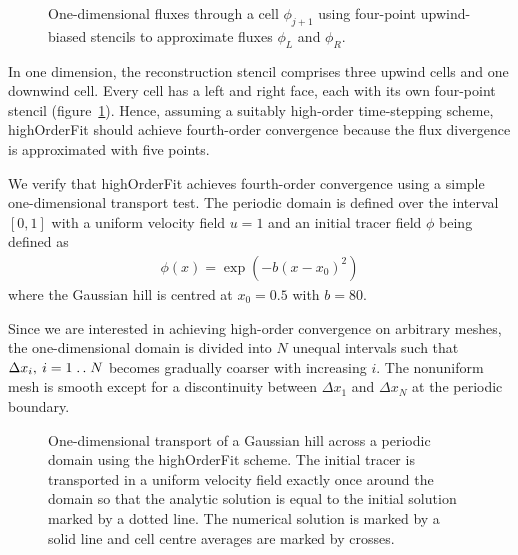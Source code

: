 \documentclass[a4paper,11pt]{article}
\newcommand{\isep}{\mathrel{{.}\,{.}}\nobreak}
\begin{document}
\begin{figure}
	\centering
	\caption{One-dimensional fluxes through a cell $\phi_{j+1}$ using four-point upwind-biased stencils to approximate fluxes $\phi_L$ and $\phi_R$.}
	\label{fig:1d-stencil}
\end{figure}

In one dimension, the reconstruction stencil comprises three upwind cells and one downwind cell.
Every cell has a left and right face, each with its own four-point stencil (figure~\ref{fig:1d-stencil}).
Hence, assuming a suitably high-order time-stepping scheme, highOrderFit should achieve fourth-order convergence because the flux divergence is approximated with five points.

We verify that highOrderFit achieves fourth-order convergence using a simple one-dimensional transport test.  The periodic domain is defined over the interval $[0,1]$ with a uniform velocity field $u = 1$ and an initial tracer field $\phi$ being defined as
\begin{align}
	\phi(x) = \exp \left( -b \left( x - x_0 \right)^2 \right)
\end{align}
where the Gaussian hill is centred at $x_0 = 0.5$ with $b = 80$.

Since we are interested in achieving high-order convergence on arbitrary meshes, the one-dimensional domain is divided into $N$ unequal intervals such that $\Delta x_i, \: i = 1\isep N$ becomes gradually coarser with increasing $i$.  The nonuniform mesh is smooth except for a discontinuity between $\Delta x_1$ and $\Delta x_N$ at the periodic boundary.

\begin{figure}
	\centering
	
	\caption{One-dimensional transport of a Gaussian hill across a periodic domain using the highOrderFit scheme.  The initial tracer is transported in a uniform velocity field exactly once around the domain so that the analytic solution is equal to the initial solution marked by a dotted line.  The numerical solution is marked by a solid line and cell centre averages are marked by crosses.}
	\label{fig:advect1D-tracer}
\end{figure}
\end{document}

